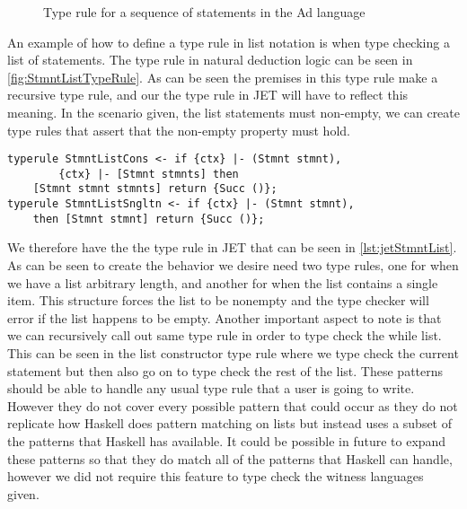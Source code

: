 \begin{figure}
    \begin{prooftree}
    \end{prooftree}
    \caption{Type rule for a sequence of statements in the Ad language}
    \label{fig:StmntListTypeRule}
\end{figure}

An example of how to define a type rule in list notation is when type checking a list of statements.
The type rule in natural deduction logic can be seen in \autoref{fig:StmntListTypeRule}.
As can be seen the premises in this type rule make a recursive type rule, and our the type rule in JET will have to reflect this meaning.
In the scenario given, the list statements must non-empty, we can create type rules that assert that the non-empty property must hold.

\begin{lstlisting}[caption = Type rule in JET for a seqeunce of statements, label=lst:jetStmntList]
typerule StmntListCons <- if {ctx} |- (Stmnt stmnt), 
        {ctx} |- [Stmnt stmnts] then 
    [Stmnt stmnt stmnts] return {Succ ()};
typerule StmntListSngltn <- if {ctx} |- (Stmnt stmnt),
    then [Stmnt stmnt] return {Succ ()};
\end{lstlisting}

We therefore have the the type rule in JET that can be seen in \autoref{lst:jetStmntList}.
As can be seen to create the behavior we desire need two type rules, one for when we have a list arbitrary length, and another for when the list contains a single item.
This structure forces the list to be nonempty and the type checker will error if the list happens to be empty.
Another important aspect to note is that we can recursively call out same type rule in order to type check the while list.
This can be seen in the list constructor type rule where we type check the current statement but then also go on to type check the rest of the list.
These patterns should be able to handle any usual type rule that a user is going to write.
However they do not cover every possible pattern that could occur as they do not replicate how Haskell does pattern matching on lists but instead uses a subset of the patterns that Haskell has available.
It could be possible in future to expand these patterns so that they do match all of the patterns that Haskell can handle, however we did not require this feature to type check the witness languages given.

